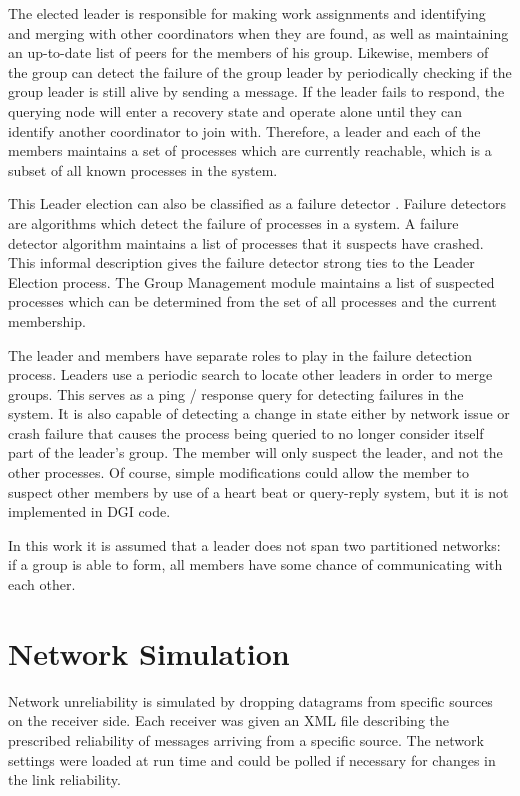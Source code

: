 The elected leader is responsible for making work assignments and identifying and merging with other coordinators when they are found, as well as maintaining an up-to-date list of peers for the members of his group.  Likewise, members of  the group can detect the failure of the group leader by periodically checking  if the group leader is still alive by sending a message. If the leader fails to  respond, the querying node will enter a recovery state and operate alone until  they can identify another coordinator to join with. Therefore, a leader and each of the members maintains a set of processes which are currently reachable, which is a subset of all known processes in the system.

This Leader election can also be classified as a failure detector \cite{LEADERELECTIONEVAL}. Failure detectors are algorithms which detect the failure of processes in a system. A failure detector algorithm maintains a list of processes that it suspects have crashed. This informal description gives the failure detector strong ties to the Leader Election process. The Group Management module maintains a list of  suspected processes which can be determined from the set of all processes and the current membership. 

The leader and members have separate roles to play in the failure detection process. Leaders use a periodic search to locate other leaders in order to merge groups. This serves as a ping / response query for detecting failures in the system. It is also capable of detecting a change in state either by network issue or crash failure that causes the process being queried to no longer consider itself part of the leader's group. The member will only suspect the leader, and not the other processes.
Of course, simple modifications could allow the member to suspect other members by use of a heart beat or query-reply system, but it is not implemented in DGI code.

In this work it is assumed that a leader does not span two partitioned networks: if a group is able to form, all members have some chance of communicating with each other.

\section{Network Simulation}

Network unreliability is simulated by dropping datagrams from specific sources on the receiver side. Each receiver was given an XML file describing the prescribed reliability of messages arriving from a specific source. The network settings were loaded at run time and could be polled if necessary for changes in the link reliability.

